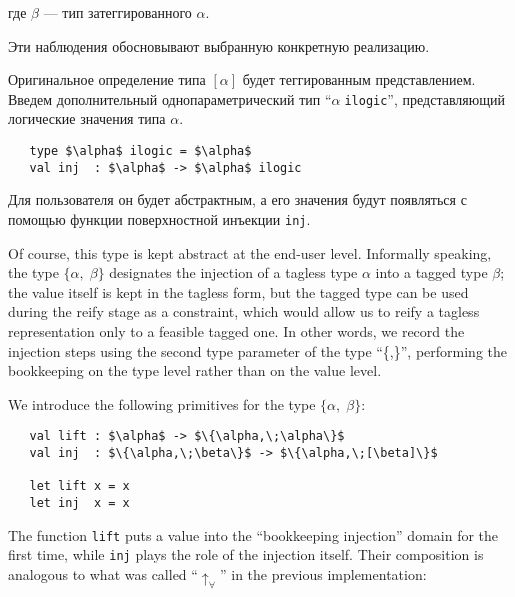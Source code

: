 \noindent где $\beta$ --- тип затеггированного $\alpha$.

Эти наблюдения обосновывают выбранную конкретную реализацию.

Оригинальное определение типа $[\alpha]$ будет теггированным представлением.
Введем дополнительный однопараметрический тип \enquote{$\alpha\;$\lstinline|ilogic|}, %
представляющий логические значения типа $\alpha$.


\begin{lstlisting}
   type $\alpha$ ilogic = $\alpha$
   val inj  : $\alpha$ -> $\alpha$ ilogic
\end{lstlisting}

\noindent Для пользователя он будет абстрактным, а его значения будут появляться с помощью функции поверхностной инъекции \lstinline=inj=.

Of course, this type is kept abstract at the end-user level. Informally speaking, the type $\{\alpha,\;\beta\}$ designates the
injection of a tagless type $\alpha$ into a tagged type $\beta$; the value itself is kept in the tagless form, but
the tagged type can be used during the reify stage as a constraint, which would allow us to reify a tagless
representation only to a feasible tagged one. In other words, we record the injection steps using the second
type parameter of the type ``\{,\}'', performing the bookkeeping on the type level rather than on the value level.

We introduce the following primitives for the type $\{\alpha,\;\beta\}$:

\begin{lstlisting}
   val lift : $\alpha$ -> $\{\alpha,\;\alpha\}$
   val inj  : $\{\alpha,\;\beta\}$ -> $\{\alpha,\;[\beta]\}$

   let lift x = x
   let inj  x = x
\end{lstlisting}

The function \lstinline|lift| puts a value into the ``bookkeeping injection'' domain for the first time, while
\lstinline|inj| plays the role of the injection itself. Their composition is analogous to what was
called ``$\uparrow_\forall$'' in the previous implementation:

